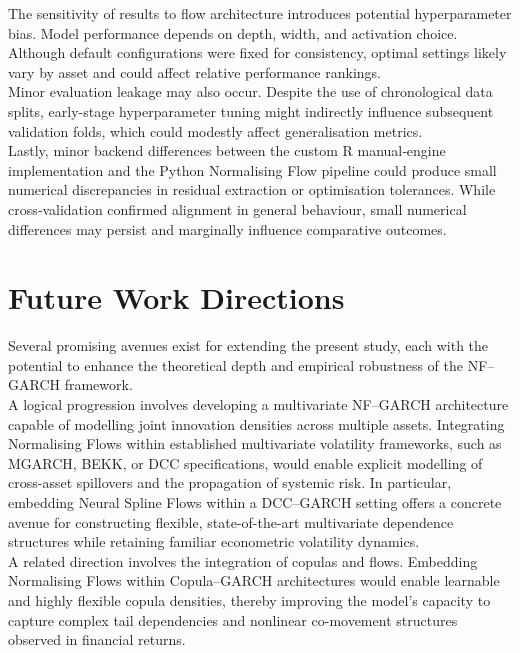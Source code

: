 \documentclass[oneside,12pt]{CUEDthesisPSnPDF}
\begin{document}
\medskip
\noindent
The sensitivity of results to flow architecture introduces potential hyperparameter bias. Model performance depends on depth, width, and activation choice. Although default configurations were fixed for consistency, optimal settings likely vary by asset and could affect relative performance rankings.\\

\medskip
\noindent
Minor evaluation leakage may also occur. Despite the use of chronological data splits, early-stage hyperparameter tuning might indirectly influence subsequent validation folds, which could modestly affect generalisation metrics.\\

\medskip
\noindent
Lastly, minor backend differences between the custom R manual‑engine implementation and the Python Normalising Flow pipeline could produce small numerical discrepancies in residual extraction or optimisation tolerances. While cross‑validation confirmed alignment in general behaviour, small numerical differences may persist and marginally influence comparative outcomes.\\


\section{Future Work Directions}
\noindent
Several promising avenues exist for extending the present study, each with the potential to enhance the theoretical depth and empirical robustness of the NF–GARCH framework.\\

\medskip
\noindent
A logical progression involves developing a multivariate NF–GARCH architecture capable of modelling joint innovation densities across multiple assets. Integrating Normalising Flows within established multivariate volatility frameworks, such as MGARCH, BEKK, or DCC specifications, would enable explicit modelling of cross-asset spillovers and the propagation of systemic risk. In particular, embedding Neural Spline Flows within a DCC–GARCH setting offers a concrete avenue for constructing flexible, state-of-the-art multivariate dependence structures while retaining familiar econometric volatility dynamics.\\

\medskip
\noindent
A related direction involves the integration of copulas and flows. Embedding Normalising Flows within Copula–GARCH architectures would enable learnable and highly flexible copula densities, thereby improving the model’s capacity to capture complex tail dependencies and nonlinear co-movement structures observed in financial returns.\\
\end{document}
